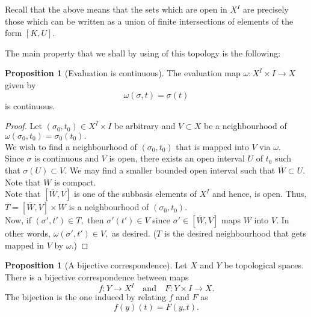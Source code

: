 \documentclass[12pt]{article}
\theoremstyle{definition}
\numberwithin{thm}{section}
\newtheorem{prop}[thm]{Proposition}
\begin{document}
Recall that the above means that the sets which are open in $X^I$ are precisely those which can be written as a union of finite intersections of elements of the form $[K, U].$ 

The main property that we shall by using of this topology is the following:

\begin{prop}[Evaluation is continuous]
	The evaluation map $\omega:X^I \times I \to X$ given by
	\begin{equation*} 
		\omega(\sigma, t) = \sigma(t)
	\end{equation*}
	is continuous.
\end{prop}

\begin{proof} 
	Let $(\sigma_0, t_0) \in X^I\times I$ be arbitrary and $V \subset X$ be a neighbourhood of $\omega(\sigma_0, t_0) = \sigma_0(t_0).$\\
	We wish to find a neighbourhood of $(\sigma_0, t_0)$ that is mapped into $V$ via $\omega.$\\
	Since $\sigma$ is continuous and $V$ is open, there exists an open interval $U$ of $t_0$ such that $\sigma(U) \subset V.$ We may find a smaller bounded open interval such that $\overline{W} \subset U.$ Note that $\overline{W}$ is compact. \\
	Note that $[\overline{W}, V]$ is one of the subbasis elements of $X^I$ and hence, is open. Thus, $T = [\overline{W}, V]\times W$ is a neighbourhood of $(\sigma_0, t_0).$\\
	Now, if $(\sigma', t') \in T,$ then $\sigma'(t') \in V$ since $\sigma' \in [\overline{W}, V]$ maps $W$ into $V.$ In other words, $\omega(\sigma', t') \in V,$ as desired. ($T$ is the desired neighbourhood that gets mapped in $V$ by $\omega.$)
\end{proof}

\begin{prop}[A bijective correspondence]\label{prop:correspondencefuncspace}
	Let $X$ and $Y$ be topological spaces. There is a bijective correspondence between maps
	\begin{equation*} 
		f:Y\to X^I \quad \text{and} \quad F:Y\times I \to X.
	\end{equation*}
	The bijection is the one induced by relating $f$ and $F$ as
	\begin{equation*} 
		f(y)(t) = F(y, t).
	\end{equation*}
\end{prop}
\end{document}
